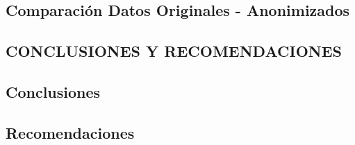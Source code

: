 \documentclass[a4paper,openright,12pt]{book}
\theoremstyle{definition}
\theoremstyle{remark}
\begin{document}
\section{Comparación Datos Originales - Anonimizados}
\clearpage

\begin{center}
 \chapter{CONCLUSIONES Y RECOMENDACIONES}\label{cap.conclusiones}
\end{center}

\section{Conclusiones}


\section{Recomendaciones}

\clearpage
\end{document}
